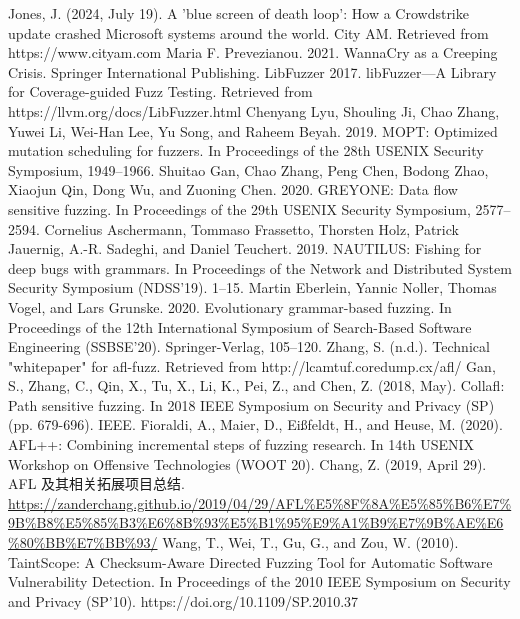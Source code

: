 \documentclass[10.5pt,compsoc]{CjC}
\theoremstyle{mystyle}
\begin{document}
\begin{thebibliography}{99}
\vspace{3mm}
  Jones, J. (2024, July 19). A 'blue screen of death loop': How a Crowdstrike update crashed Microsoft systems around the world. City AM. Retrieved from https://www.cityam.com
	 Maria F. Prevezianou. 2021. WannaCry as a Creeping Crisis. Springer International Publishing.
  LibFuzzer 2017. libFuzzer—A Library for Coverage-guided Fuzz Testing. Retrieved from https://llvm.org/docs/LibFuzzer.html
  Chenyang Lyu, Shouling Ji, Chao Zhang, Yuwei Li, Wei-Han Lee, Yu Song, and Raheem Beyah. 2019. MOPT: Optimized mutation scheduling for fuzzers. In Proceedings of the 28th USENIX Security Symposium, 1949–1966.
  Shuitao Gan, Chao Zhang, Peng Chen, Bodong Zhao, Xiaojun Qin, Dong Wu, and Zuoning Chen. 2020. GREYONE:
Data flow sensitive fuzzing. In Proceedings of the 29th USENIX Security Symposium, 2577–2594.
  Cornelius Aschermann, Tommaso Frassetto, Thorsten Holz, Patrick Jauernig, A.-R. Sadeghi, and Daniel Teuchert. 2019. NAUTILUS: Fishing for deep bugs with grammars. In Proceedings of the Network and Distributed System Security
Symposium (NDSS’19). 1–15.
  Martin Eberlein, Yannic Noller, Thomas Vogel, and Lars Grunske. 2020. Evolutionary grammar-based fuzzing. In Proceedings of the 12th International Symposium of Search-Based Software Engineering (SSBSE’20). Springer-Verlag, 105–120.
  Zhang, S. (n.d.). Technical "whitepaper" for afl-fuzz. Retrieved from http://lcamtuf.coredump.cx/afl/
  Gan, S., Zhang, C., Qin, X., Tu, X., Li, K., Pei, Z., and Chen, Z. (2018, May). Collafl: Path sensitive fuzzing. In 2018 IEEE Symposium on Security and Privacy (SP) (pp. 679-696). IEEE.
  Fioraldi, A., Maier, D., Eißfeldt, H., and Heuse, M. (2020). {AFL++}: Combining incremental steps of fuzzing research. In 14th USENIX Workshop on Offensive Technologies (WOOT 20).
  Chang, Z. (2019, April 29). AFL 及其相关拓展项目总结. 
  \url{https://zanderchang.github.io/2019/04/29/AFL%E5%8F%8A%E5%85%B6%E7%9B%B8%E5%85%B3%E6%8B%93%E5%B1%95%E9%A1%B9%E7%9B%AE%E6%80%BB%E7%BB%93/}
  Wang, T., Wei, T., Gu, G., and Zou, W. (2010). TaintScope: A Checksum-Aware Directed Fuzzing Tool for Automatic Software Vulnerability Detection. In Proceedings of the 2010 IEEE Symposium on Security and Privacy (SP'10). https://doi.org/10.1109/SP.2010.37

\end{thebibliography}
\end{document}
